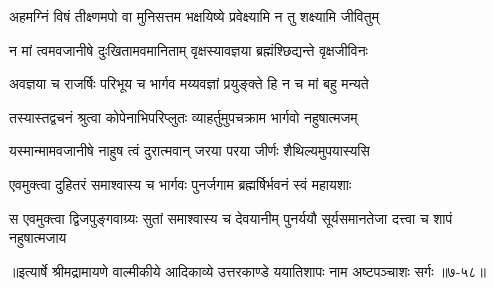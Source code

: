 \twolineshloka
{अहमग्निं विषं तीक्ष्णमपो वा मुनिसत्तम}
{भक्षयिष्ये प्रवेक्ष्यामि न तु शक्ष्यामि जीवितुम्} %

\twolineshloka
{न मां त्वमवजानीषे दुःखितामवमानिताम्}
{वृक्षस्यावज्ञया ब्रह्मंश्छिद्यन्ते वृक्षजीविनः} %

\twolineshloka
{अवज्ञया च राजर्षिः परिभूय च भार्गव}
{मय्यवज्ञां प्रयुङ्क्ते हि न च मां बहु मन्यते} %

\twolineshloka
{तस्यास्तद्वचनं श्रुत्वा कोपेनाभिपरिप्लुतः}
{व्याहर्तुमुपचक्राम भार्गवो नहुषात्मजम्} %

\twolineshloka
{यस्मान्मामवजानीषे नाहुष त्वं दुरात्मवान्}
{जरया परया जीर्णः शैथिल्यमुपयास्यसि} %

\twolineshloka
{एवमुक्त्वा दुहितरं समाश्वास्य च भार्गवः}
{पुनर्जगाम ब्रह्मर्षिर्भवनं स्वं महायशाः} %

\twolineshloka
{स एवमुक्त्वा द्विजपुङ्गवाग्र्यः सुतां समाश्वास्य च देवयानीम्}
{पुनर्ययौ सूर्यसमानतेजा दत्त्वा च शापं नहुषात्मजाय} %


॥इत्यार्षे श्रीमद्रामायणे वाल्मीकीये आदिकाव्ये उत्तरकाण्डे ययातिशापः नाम अष्टपञ्चाशः सर्गः ॥७-५८॥
